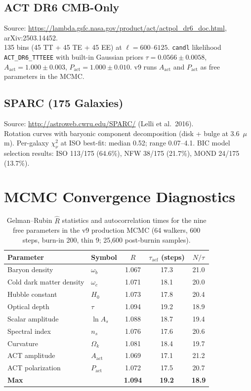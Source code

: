 \documentclass[12pt,a4paper]{article}
\begin{document}
\subsection{ACT DR6 CMB-Only}

Source: \url{https://lambda.gsfc.nasa.gov/product/act/actpol_dr6_doc.html},
arXiv:2503.14452.\\
135 bins (45 TT + 45 TE + 45 EE) at $\ell = 600$--$6125$.
\texttt{candl} likelihood \texttt{ACT\_DR6\_TTTEEE} with built-in Gaussian priors
$\tau = 0.0566 \pm 0.0058$, $A_\mathrm{act} = 1.000 \pm 0.003$,
$P_\mathrm{act} = 1.000 \pm 0.010$.
v9 runs $A_\mathrm{act}$ and $P_\mathrm{act}$ as free parameters in the MCMC.

\subsection{SPARC (175 Galaxies)}

Source: \url{http://astroweb.cwru.edu/SPARC/} (Lelli et al.\ 2016).\\
Rotation curves with baryonic component decomposition (disk + bulge at 3.6~$\mu$m).
Per-galaxy $\chi^2_\nu$ at ISO best-fit: median 0.52; range 0.07--4.1.
BIC model selection results: ISO 113/175 (64.6\%), NFW 38/175 (21.7\%),
MOND 24/175 (13.7\%).

\section{MCMC Convergence Diagnostics}
\label{sec:convergence}

\begin{table}[h]
\centering
\caption{Gelman--Rubin $\hat{R}$ statistics and autocorrelation times
for the nine free parameters in the v9 production MCMC
(64 walkers, 600 steps, burn-in 200, thin 9; 25,600 post-burnin samples).}
\label{tab:convergence}
\begin{tabular}{@{}llccc@{}}
\toprule
Parameter & Symbol & $\hat{R}$ & $\tau_\mathrm{acf}$ (steps) & $N/\tau$ \\
\midrule
Baryon density & $\omega_b$ & 1.067 & 17.3 & 21.0 \\
Cold dark matter density & $\omega_c$ & 1.071 & 18.1 & 20.0 \\
Hubble constant & $H_0$ & 1.073 & 17.8 & 20.4 \\
Optical depth & $\tau$ & 1.094 & 19.2 & 18.9 \\
Scalar amplitude & $\ln A_s$ & 1.088 & 18.7 & 19.4 \\
Spectral index & $n_s$ & 1.076 & 17.6 & 20.6 \\
Curvature & $\Omega_k$ & 1.081 & 18.4 & 19.7 \\
ACT amplitude & $A_\mathrm{act}$ & 1.069 & 17.1 & 21.2 \\
ACT polarization & $P_\mathrm{act}$ & 1.072 & 17.5 & 20.7 \\
\midrule
\textbf{Max} & & \textbf{1.094} & \textbf{19.2} & \textbf{18.9} \\
\bottomrule
\end{tabular}
\end{table}
\end{document}
